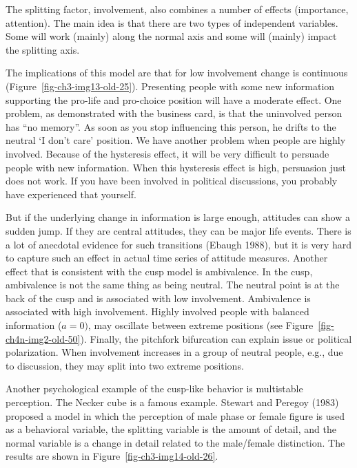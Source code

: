 \documentclass[
  a4paper,
  DIV=11,
  numbers=noendperiod,
  oneside]{scrreprt}
\begin{document}
The splitting factor, involvement, also combines a number of effects
(importance, attention). The main idea is that there are two types of
independent variables. Some will work (mainly) along the normal axis and
some will (mainly) impact the splitting axis.

The implications of this model are that for low involvement change is
continuous (Figure~\ref{fig-ch3-img13-old-25}). Presenting people with
some new information supporting the pro-life and pro-choice position
will have a moderate effect. One problem, as demonstrated with the
business card, is that the uninvolved person has ``no memory''. As soon
as you stop influencing this person, he drifts to the neutral `I don't
care' position. We have another problem when people are highly involved.
Because of the hysteresis effect, it will be very difficult to persuade
people with new information. When this hysteresis effect is high,
persuasion just does not work. If you have been involved in political
discussions, you probably have experienced that yourself.

But if the underlying change in information is large enough, attitudes
can show a sudden jump. If they are central attitudes, they can be major
life events. There is a lot of anecdotal evidence for such transitions
(Ebaugh 1988), but it is very hard to capture such an effect in actual
time series of attitude measures. Another effect that is consistent with
the cusp model is ambivalence. In the cusp, ambivalence is not the same
thing as being neutral. The neutral point is at the back of the cusp and
is associated with low involvement. Ambivalence is associated with high
involvement. Highly involved people with balanced information
(\(a = 0)\), may oscillate between extreme positions (see
Figure~\ref{fig-ch4n-img2-old-50}). Finally, the pitchfork bifurcation
can explain issue or political polarization. When involvement increases
in a group of neutral people, e.g., due to discussion, they may split
into two extreme positions.

Another psychological example of the cusp-like behavior is multistable
perception. The Necker cube is a famous example. Stewart and Peregoy
(1983) proposed a model in which the perception of male phase or female
figure is used as a behavioral variable, the splitting variable is the
amount of detail, and the normal variable is a change in detail related
to the male/female distinction. The results are shown in
Figure~\ref{fig-ch3-img14-old-26}.
\end{document}
